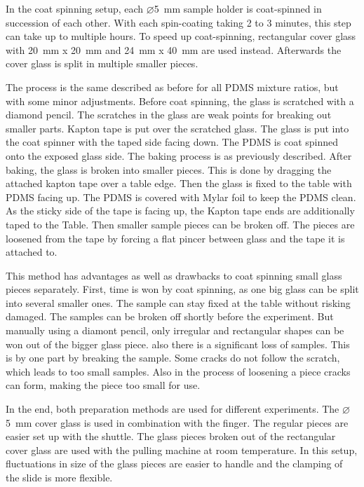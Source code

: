 In the coat spinning setup, each  $\varnothing$\SI{5}{\milli\meter} sample holder is coat-spinned in succession of each other. With each spin-coating taking 2 to 3 minutes, this step can take up to multiple hours. To speed up coat-spinning, rectangular cover glass with \SI{20}{\milli\meter} x \SI{20}{\milli\meter} and \SI{24}{\milli\meter} x \SI{40}{\milli\meter} are used instead. Afterwards the cover glass is split in multiple smaller pieces. 

The process is the same described as before for all PDMS mixture ratios, but with some minor adjustments. Before coat spinning, the glass is scratched with a diamond pencil. The scratches in the glass are weak points for breaking out smaller parts. Kapton tape is put over the scratched glass. The glass is put into the coat spinner with the taped side facing down. The PDMS is coat spinned onto the exposed glass side. The baking process is as previously described. After baking, the glass is broken into smaller pieces. This is done by dragging the attached kapton tape over a table edge. Then the glass is fixed to the table with PDMS facing up. The PDMS is covered with Mylar foil to keep the PDMS clean. As the sticky side of the tape is facing up, the Kapton tape ends are additionally taped to the Table. Then smaller sample pieces can be broken off. The pieces are loosened from the tape by forcing a flat pincer between glass and the tape it is attached to.

This method has advantages as well as drawbacks to coat spinning small glass pieces separately. First, time is won by coat spinning, as one big glass can be split into several smaller ones. The sample can stay fixed at the table without risking damaged. The samples can be broken off shortly before the experiment. But manually using a diamont pencil, only irregular and rectangular shapes can be won out of the bigger glass piece. also there is a significant loss of samples. This is by one part by breaking the sample. Some cracks do not follow the scratch, which leads to too small samples. Also in the process of loosening a piece cracks can form, making the piece too small for use.

In the end, both preparation methods are used for different experiments. The $\varnothing$\SI{5}{\milli\meter} cover glass is used in combination with the finger. The regular pieces are easier set up with the shuttle. The glass pieces broken out of the rectangular cover glass are used with the pulling machine at room temperature. In this setup, fluctuations in size of the glass pieces are easier to handle and the clamping of the slide is more flexible. %

